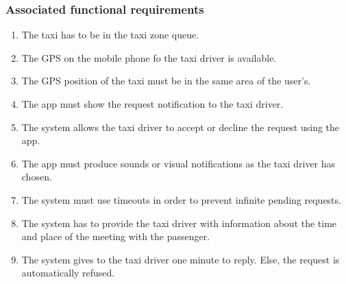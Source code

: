 \subsubsection{Associated functional requirements}
\begin{enumerate}
\item The taxi has to be in the taxi zone queue.
\item The GPS on the mobile phone fo the taxi driver is available.
\item The GPS position of the taxi must be in the same area of the user's.
\item The app must show the request notification to the taxi driver.
\item The system allows the taxi driver to accept or decline the request using the app.
\item The app must produce sounds or visual notifications as the taxi driver has chosen.
\item The system must use timeouts in order to prevent infinite pending requests.
\item The system has to provide the taxi driver with information about the time and place of the meeting with the passenger.
\item The system gives to the taxi driver one minute to reply. Else, the request is automatically refused.
\end{enumerate}